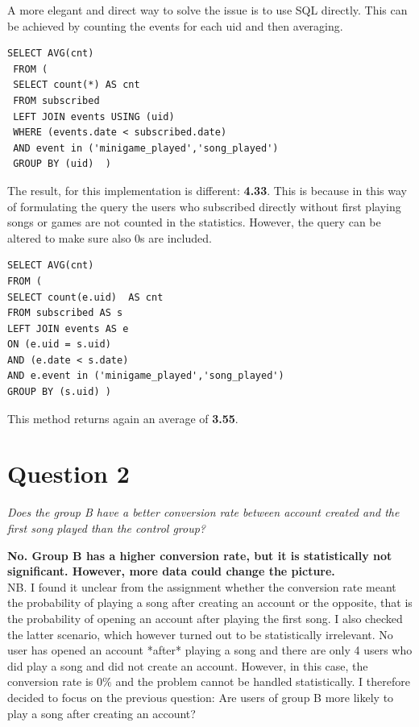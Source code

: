\documentclass[paper=a4, fontsize=10pt]{report}
\begin{document}
A more elegant and direct way to solve the issue is to use SQL directly. This can be achieved by
counting the events for each uid and then averaging.

\footnotesize
\begin{lstlisting}[frame=single,caption=Return SQL average \label{code:sql_average_table}]
 SELECT AVG(cnt)
 FROM (  
 SELECT count(*) AS cnt
 FROM subscribed 
 LEFT JOIN events USING (uid)
 WHERE (events.date < subscribed.date)
 AND event in ('minigame_played','song_played') 
 GROUP BY (uid)  )
\end{lstlisting}
\normalsize

The result, for this implementation is different: \textbf{4.33}. This is because in this way of
formulating the query the users who subscribed directly without first playing songs or 
games are not counted in the statistics. However, the query can be altered to make sure also 0s are included.

\footnotesize
\begin{lstlisting}[frame=single,caption=Return SQL average - Fixed \label{code:sql_average_fixed_table}]
SELECT AVG(cnt)
FROM (
SELECT count(e.uid)  AS cnt
FROM subscribed AS s
LEFT JOIN events AS e
ON (e.uid = s.uid) 
AND (e.date < s.date) 
AND e.event in ('minigame_played','song_played') 
GROUP BY (s.uid) )
\end{lstlisting}
\normalsize
This method returns again an average of \textbf{3.55}.


\section*{Question 2}

\textit{Does the group B have a better conversion rate between account created and the first song played than the control group?}

\textbf{No. Group B has a higher conversion rate, but it is statistically not significant. However, more data could
change the picture.}\\

NB. I found it unclear from the assignment whether the conversion rate meant the probability of
playing a song after creating an account or the opposite, that is the probability of opening an account after
playing the first song. I also checked the latter scenario, which however turned out to be statistically irrelevant.
No user has opened an account *after* playing a song and there are only 4 users who did play a song and did not create an account.
However, in this case, the conversion rate is $0\%$ and the problem cannot be handled statistically. I therefore decided
to focus on the previous question: Are users of group B more likely to play a song after creating an account?
\end{document}
